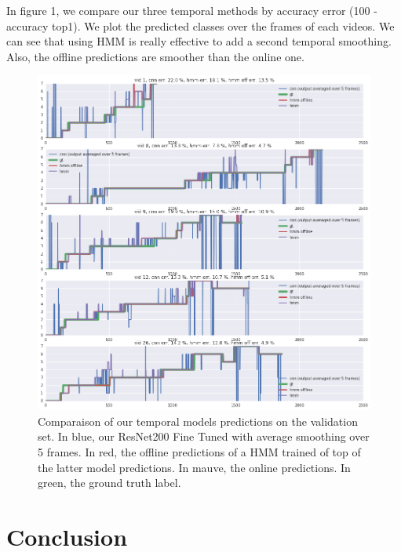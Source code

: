 \documentclass[10pt,twocolumn,letterpaper]{article}
\begin{document}
In figure 1, we compare our three temporal methods by accuracy error (100 - accuracy top1). We plot the predicted classes over the frames of each videos. We can see that using HMM is really effective to add a second temporal smoothing. Also, the offline predictions are smoother than the online one.

\begin{figure}
\begin{center}
   \includegraphics[width=1\linewidth]{images/visu.png}
\end{center}
   \caption{Comparaison of our temporal models predictions on the validation set. In blue, our ResNet200 Fine Tuned with average smoothing over 5 frames. In red, the offline predictions of a HMM trained of top of the latter model predictions. In mauve, the online predictions. In green, the ground truth label. }
\label{fig:long}
\label{fig:onecol}
\end{figure}



\section{Conclusion}
\end{document}
